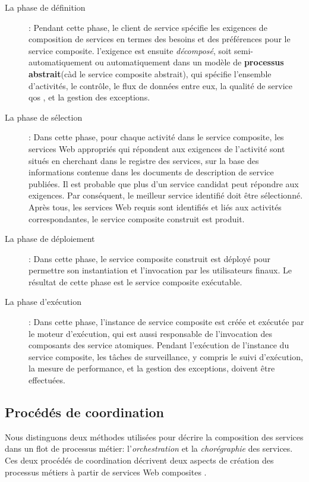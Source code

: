   

  \renewcommand{\descriptionlabel}[1]{\hspace{0.5cm}\textbullet~\textsf{#1}}
  \begin{description}
  \item[La phase de définition]: Pendant cette phase, le client de
    service spécifie les exigences de composition de services en termes
    des besoins et des préférences pour le service
    composite. l'exigence est ensuite \textit{décomposé}, soit
    semi-automatiquement ou automatiquement dans un modèle de
    \textbf{processus abstrait}(càd le service composite
    abstrait), qui spécifie l'ensemble d'activités, le contrôle,
    le flux de données entre eux, la qualité de service \acrshort{qos}
    , et la gestion des exceptions.

  \item[La phase de sélection]: Dans cette phase, pour chaque activité
    dans le service composite, les services Web appropriés qui
    répondent aux exigences de l'activité sont situés en cherchant dans
    le registre des services, sur la base des informations contenue
    dans les documents de description de service publiées. Il est
    probable que plus d'un service candidat peut répondre aux
    exigences. Par conséquent, le meilleur service identifié doit
    être sélectionné. Après tous, les services Web requis sont
    identifiés et liés aux activités correspondantes, le service
    composite construit est produit.

  \item[La phase de déploiement]: Dans cette phase, le service
    composite construit est déployé pour permettre son instantiation
    et l'invocation par les utilisateurs finaux. Le résultat de cette
    phase est le service composite exécutable.

  \item[La phase d'exécution]: Dans cette phase, l'instance de service
    composite est créée et exécutée par le moteur d'exécution, qui est
    aussi responsable de l'invocation des composants des service
    atomiques. Pendant l'exécution de l'instance du service composite,
    les tâches de surveillance, y compris le suivi d'exécution, la mesure
    de performance, et la gestion des exceptions, doivent être
    effectuées.
  \end{description}
  \enddescription

  \subsection{Procédés de coordination}
  \label{sec:proc-de-coord}
  Nous distinguons deux méthodes utilisées pour décrire la composition
  des services dans un flot de processus métier: l'\emph{orchestration}
   et la \emph{chorégraphie} des services. Ces deux
  procédés de coordination décrivent deux aspects de création des
  processus métiers à partir de services Web composites
  \cite{peltz2003web}.\medskip

